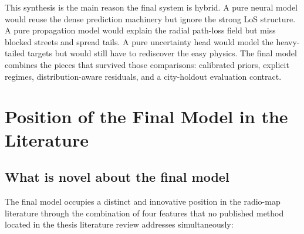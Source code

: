 This synthesis is the main reason the final system is hybrid. A pure neural
model would reuse the dense prediction machinery but ignore the strong LoS
structure. A pure propagation model would explain the radial path-loss field
but miss blocked streets and spread tails. A pure uncertainty head would model
the heavy-tailed targets but would still have to rediscover the easy physics.
The final model combines the pieces that survived those comparisons: calibrated priors,
explicit regimes, distribution-aware residuals, and a city-holdout evaluation
contract.

\section{Position of the Final Model in the Literature}
\label{sec:soa_position}

\subsection{What is novel about the final model}

The final model occupies a distinct and innovative position in the radio-map literature
through the combination of four features that no published method located in
the thesis literature review addresses simultaneously:

